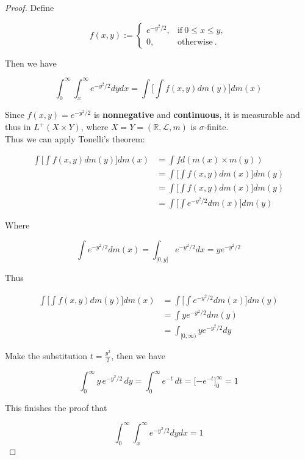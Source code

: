 \documentclass{qlnotes-export}
\begin{document}
\begin{proof}

Define

\[f(x,y) := \left\{ \begin{matrix}
{e^{- y^{2}/2},} & {\text{if}\ 0 \leq x \leq y,} \\
{0,} & {\text{otherwise}\ .}
\end{matrix} \right.\]

Then we have

\[\int_{0}^{\infty}\int_{x}^{\infty}e^{- y^{2}/2} dy dx = \int\lbrack\int f(x,y) dm(y)\rbrack dm(x)\]

Since \(f(x,y) = e^{- y^{2}/2}\) is \textbf{nonnegative} and \textbf{continuous}, it is measurable and thus in \(L^{+}(X \times Y)\), where \(X = Y = ({\mathbb{R}},\mathcal{L},m)\) is \(\sigma\)-finite.\\
Thus we can apply Tonelli's theorem:

\[\begin{matrix}
{\int\lbrack\int f(x,y) dm(y)\rbrack dm(x)} & {= \int f d(m(x) \times m(y))} \\
 & {= \int\lbrack\int f(x,y) dm(x)\rbrack dm(y)} \\
 & {= \int\lbrack\int f(x,y) dm(x)\rbrack dm(y)} \\
 & {= \int\lbrack\int e^{- y^{2}/2} dm(x)\rbrack dm(y)}
\end{matrix}\]

Where

\[\int e^{- y^{2}/2} dm(x) = \int_{\lbrack 0,y\rbrack}e^{- y^{2}/2} dx = ye^{- y^{2}/2}\]

Thus

\[\begin{matrix}
{\int\lbrack\int f(x,y) dm(y)\rbrack dm(x)} & {= \int\lbrack\int e^{- y^{2}/2} dm(x)\rbrack dm(y)} \\
 & {= \int ye^{- y^{2}/2} dm(y)} \\
 & {= \int_{\lbrack 0,\infty)}ye^{- y^{2}/2} dy}
\end{matrix}\]

Make the substitution \(t = \frac{y^{2}}{2}\), then we have

\[\int_{0}^{\infty}y\, e^{- y^{2}/2}\, dy = \int_{0}^{\infty}e^{- t}\, dt = \lbrack - e^{- t}\rbrack_{0}^{\infty} = 1\]

This finishes the proof that

\[\int_{0}^{\infty}\int_{x}^{\infty}e^{- y^{2}/2} dy dx = 1\]

\end{proof}
\end{document}
